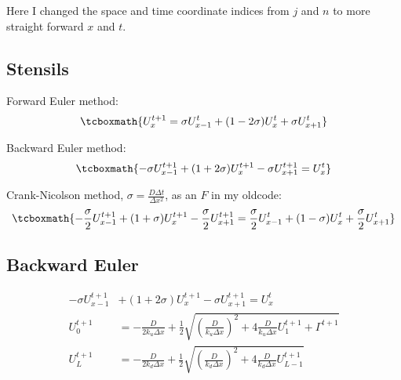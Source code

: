 \documentclass[../summary.tex]{subfiles}
\begin{document}
    
Here I changed the space and time coordinate indices from $j$ and $n$ to more straight forward $x$ and $t$.
\subsection{Stensils}

Forward Euler method:
\begin{equation}
    \tcboxmath{
    U_{x}^{t+1} = \sigma U_{x-1}^{t} + (1-2\sigma)U_{x}^{t} + \sigma U_{x+1}^{t}
    }
\end{equation}

Backward Euler method:
\begin{equation}
    \tcboxmath{
    -\sigma U_{x-1}^{t+1} + (1+2\sigma)U_{x}^{t+1} - \sigma U_{x+1}^{t+1} = U_{x}^{t}
    }
\end{equation}

Crank-Nicolson method, $\sigma = \frac{D\Delta t}{\Delta x^2}$, as an $F$ in my oldcode:
\begin{equation}
    \tcboxmath{
    -\frac{\sigma}{2} U_{x-1}^{t+1} + (1+\sigma)U_{x}^{t+1} - \frac{\sigma}{2} U_{x+1}^{t+1} = \frac{\sigma}{2} U_{x-1}^{t} + (1-\sigma)U_{x}^{t} + \frac{\sigma}{2} U_{x+1}^{t}
    }
\end{equation}

\subsection{Backward Euler}

\begin{align}
    -\sigma U_{x-1}^{t+1} &+ (1+2\sigma)U_{x}^{t+1} - \sigma U_{x+1}^{t+1} = U_{x}^{t}\\
    U_{0}^{t+1} &= -\frac{D}{2k_u\Delta x} + \frac{1}{2}\sqrt{\left(\frac{D}{k_u\Delta x}\right)^2 + 4\frac{D}{k_u\Delta x}U_{1}^{t+1} + \Gamma^{t+1}}\\
    U_{L}^{t+1} &= -\frac{D}{2k_d\Delta x} + \frac{1}{2}\sqrt{\left(\frac{D}{k_d\Delta x}\right)^2 + 4\frac{D}{k_d\Delta x}U_{L-1}^{t+1}}
\end{align}
\end{document}
